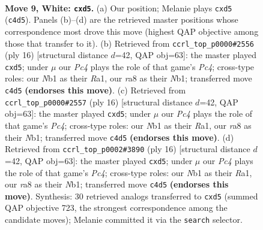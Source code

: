 \documentclass[11pt]{article}
\begin{document}
\clearpage

\begin{figure}[p]\centering
\begin{subfigure}{0.46\textwidth}\centering
\resizebox{\linewidth}{!}{%
\newchessgame
\chessboard[
  setfen={r1bqkb1r/ppp3p1/2n5/3p1p1p/2PPn3/3B1N2/PP3PPP/RNBQ1RK1 w kq - 0 9},
  showmover=false,
  pgfstyle=straightmove, color=movearrow, markmove={c4-d5}
]}
\caption{}
\end{subfigure}\hfill
\begin{subfigure}{0.46\textwidth}\centering
\resizebox{\linewidth}{!}{%
\newchessgame
\chessboard[
  setfen={r1bq1rk1/ppp1bppp/2n5/3p4/2PPn3/3B1N2/PP3PPP/RNBQ1RK1 w - - 1 9},
  showmover=false,
  pgfstyle=straightmove, color=movearrow, markmove={c4-d5}
]}
\caption{}
\end{subfigure}
\\[4pt]
\begin{subfigure}{0.46\textwidth}\centering
\resizebox{\linewidth}{!}{%
\newchessgame
\chessboard[
  setfen={r1bq1rk1/ppp1bppp/2n5/3p4/2PPn3/3B1N2/PP3PPP/RNBQ1RK1 w - - 1 9},
  showmover=false,
  pgfstyle=straightmove, color=movearrow, markmove={c4-d5}
]}
\caption{}
\end{subfigure}\hfill
\begin{subfigure}{0.46\textwidth}\centering
\resizebox{\linewidth}{!}{%
\newchessgame
\chessboard[
  setfen={r1bq1rk1/ppp1bppp/2n5/3p4/2PPn3/3B1N2/PP3PPP/RNBQ1RK1 w - - 1 9},
  showmover=false,
  pgfstyle=straightmove, color=movearrow, markmove={c4-d5}
]}
\caption{}
\end{subfigure}
\caption{\textbf{Move 9, White: \texttt{cxd5}.} (a) Our position; Melanie plays \texttt{cxd5} (\texttt{c4d5}). Panels (b)--(d) are the retrieved master positions whose correspondence most drove this move (highest QAP objective among those that transfer to it). (b) Retrieved from \texttt{ccrl\_top\_p0000\#2556} (ply 16) [structural distance $d$=42, QAP obj=63]: the master played \texttt{cxd5}; under $\mu$ our \emph{Pc4} plays the role of that game's \emph{Pc4}; cross-type roles: our \emph{N}b1 as their \emph{R}a1, our \emph{r}a8 as their \emph{N}b1; transferred move \texttt{c4d5} \textbf{(endorses this move)}. (c) Retrieved from \texttt{ccrl\_top\_p0000\#2557} (ply 16) [structural distance $d$=42, QAP obj=63]: the master played \texttt{cxd5}; under $\mu$ our \emph{Pc4} plays the role of that game's \emph{Pc4}; cross-type roles: our \emph{N}b1 as their \emph{R}a1, our \emph{r}a8 as their \emph{N}b1; transferred move \texttt{c4d5} \textbf{(endorses this move)}. (d) Retrieved from \texttt{ccrl\_top\_p0002\#3890} (ply 16) [structural distance $d$=42, QAP obj=63]: the master played \texttt{cxd5}; under $\mu$ our \emph{Pc4} plays the role of that game's \emph{Pc4}; cross-type roles: our \emph{N}b1 as their \emph{R}a1, our \emph{r}a8 as their \emph{N}b1; transferred move \texttt{c4d5} \textbf{(endorses this move)}. Synthesis: 30 retrieved analogs transferred to \texttt{cxd5} (summed QAP objective 723, the strongest correspondence among the candidate moves); Melanie committed it via the \texttt{search} selector.}
\label{fig:thought-m16}
\end{figure}
\end{document}
